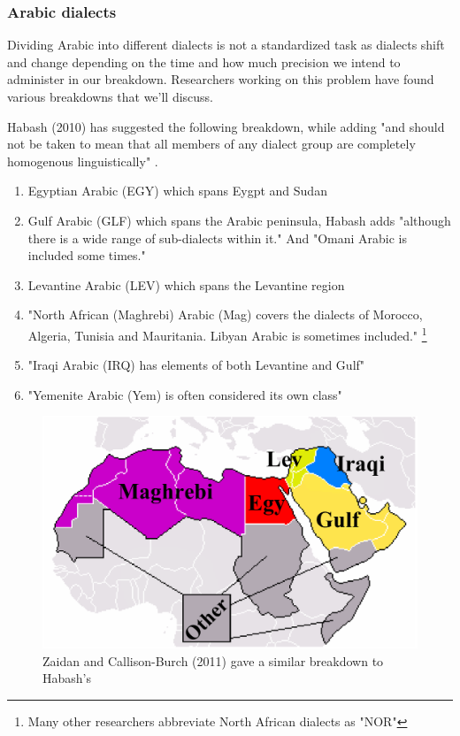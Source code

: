 \documentclass[12pt]{diazessay}
\begin{document}
        
        \subsubsection{Arabic dialects}
        Dividing Arabic into different dialects is not a standardized task as dialects shift and change depending on the time and how much precision we intend to administer in our breakdown. Researchers working on this problem have found various breakdowns that we'll discuss.
        
        Habash (2010) has suggested the following breakdown, while adding "and should not be taken to mean that all members of any dialect group are completely homogenous linguistically" \cite{habash}.
        \begin{enumerate}
            \item Egyptian Arabic (EGY) which spans Eygpt and Sudan
            \item  Gulf Arabic (GLF) which spans the Arabic peninsula, Habash adds "although there is a wide range of sub-dialects within it." And "Omani Arabic is included some times."
            \item Levantine Arabic (LEV) which spans the Levantine region
            \item "North African (Maghrebi) Arabic (Mag) covers the dialects of Morocco, Algeria, Tunisia and Mauritania. Libyan Arabic is sometimes included." \footnote{Many other researchers abbreviate North African dialects as "NOR"}
            \item "Iraqi Arabic (IRQ) has elements of both Levantine and Gulf"
            \item "Yemenite Arabic (Yem) is often considered its own class"
        \end{enumerate}
        
        \begin{figure}[h]
            \centering
            \includegraphics[scale=0.2]{Figures/Zaidan and Burch dialect breakdown.png}
            \caption{Zaidan and Callison-Burch (2011) gave a similar breakdown\cite{zaidan_burch} to Habash's}
            \label{fig:cmp}
        \end{figure}
        
\end{document}
